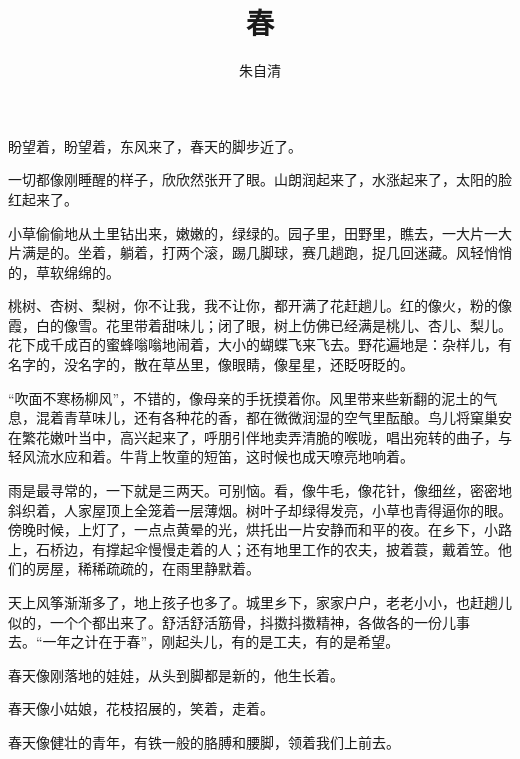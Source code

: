 \documentclass[UTF8, zihao=-4]{ctexart}
\title{\kaishu 春}
\author{\kaishu 朱自清}
\date{}
\begin{document}
\maketitle

\kaishu
\setlength{\parindent}{2em}
\setlength{\parskip}{0.8em}
\onehalfspacing

盼望着，盼望着，东风来了，春天的脚步近了。

一切都像刚睡醒的样子，欣欣然张开了眼。山朗润起来了，水涨起来了，太阳的脸红起来了。

小草偷偷地从土里钻出来，嫩嫩的，绿绿的。园子里，田野里，瞧去，一大片一大片满是的。坐着，躺着，打两个滚，踢几脚球，赛几趟跑，捉几回迷藏。风轻悄悄的，草软绵绵的。

桃树、杏树、梨树，你不让我，我不让你，都开满了花赶趟儿。红的像火，粉的像霞，白的像雪。花里带着甜味儿；闭了眼，树上仿佛已经满是桃儿、杏儿、梨儿。花下成千成百的蜜蜂嗡嗡地闹着，大小的蝴蝶飞来飞去。野花遍地是：杂样儿，有名字的，没名字的，散在草丛里，像眼睛，像星星，还眨呀眨的。

“吹面不寒杨柳风”，不错的，像母亲的手抚摸着你。风里带来些新翻的泥土的气息，混着青草味儿，还有各种花的香，都在微微润湿的空气里酝酿。鸟儿将窠巢安在繁花嫩叶当中，高兴起来了，呼朋引伴地卖弄清脆的喉咙，唱出宛转的曲子，与轻风流水应和着。牛背上牧童的短笛，这时候也成天嘹亮地响着。

雨是最寻常的，一下就是三两天。可别恼。看，像牛毛，像花针，像细丝，密密地斜织着，人家屋顶上全笼着一层薄烟。树叶子却绿得发亮，小草也青得逼你的眼。傍晚时候，上灯了，一点点黄晕的光，烘托出一片安静而和平的夜。在乡下，小路上，石桥边，有撑起伞慢慢走着的人；还有地里工作的农夫，披着蓑，戴着笠。他们的房屋，稀稀疏疏的，在雨里静默着。

天上风筝渐渐多了，地上孩子也多了。城里乡下，家家户户，老老小小，也赶趟儿似的，一个个都出来了。舒活舒活筋骨，抖擞抖擞精神，各做各的一份儿事去。“一年之计在于春”，刚起头儿，有的是工夫，有的是希望。

春天像刚落地的娃娃，从头到脚都是新的，他生长着。

春天像小姑娘，花枝招展的，笑着，走着。

春天像健壮的青年，有铁一般的胳膊和腰脚，领着我们上前去。
\end{document}
